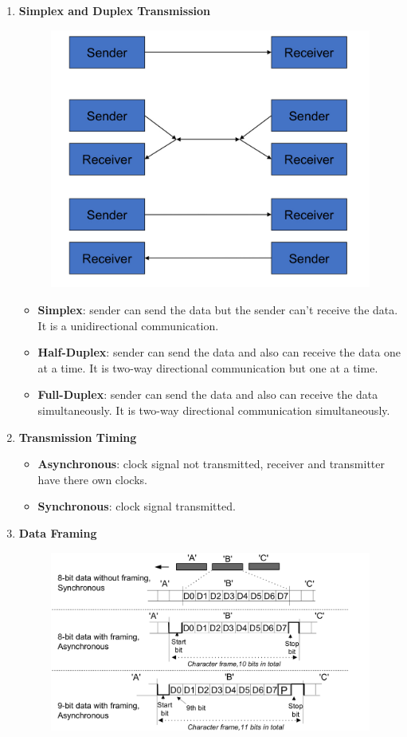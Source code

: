 \documentclass[a4paper]{article}
\begin{document}
\begin{enumerate}[label = \arabic*.]
    \item \textbf{Simplex and Duplex Transmission}
      \begin{figure}[H]
        \centering
        \includegraphics[width=0.4\linewidth]{Simplex_duplex_transmission.jpeg}
        \label{fig:Simplex_duplex_transmission.jpeg}
      \end{figure}

      \begin{itemize}[leftmargin = 1cm]
        \item \textbf{Simplex}: sender can send the data but the sender can't receive the data. It is a unidirectional communication.
        \item \textbf{Half-Duplex}: sender can send the data and also can receive the data one at a time. It is two-way directional communication but one at a time.
        \item \textbf{Full-Duplex}: sender can send the data and also can receive the data simultaneously. It is two-way directional communication simultaneously.
      \end{itemize}

    \item \textbf{Transmission Timing}
      \begin{itemize}[leftmargin = 1cm]
        \item \textbf{Asynchronous}: clock signal not transmitted, receiver and transmitter have there own clocks.
        \item \textbf{Synchronous}: clock signal transmitted.
      \end{itemize}

    \item \textbf{Data Framing}
      \begin{figure}[H]
        \centering
        \includegraphics[width=0.8\linewidth]{Data_framing.jpeg}
        \label{fig:Data_framing.jpeg}
      \end{figure}


\end{enumerate}
\end{document}
